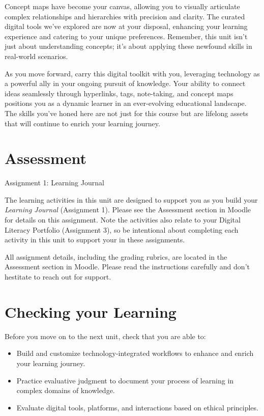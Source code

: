 \documentclass[
]{book}
\providecommand{\tightlist}{%
  \setlength{\itemsep}{0pt}\setlength{\parskip}{0pt}}
\theoremstyle{definition}
\theoremstyle{definition}
\theoremstyle{definition}
\theoremstyle{definition}
\theoremstyle{remark}
\begin{document}
Concept maps have become your canvas, allowing you to visually articulate complex relationships and hierarchies with precision and clarity. The curated digital tools we've explored are now at your disposal, enhancing your learning experience and catering to your unique preferences. Remember, this unit isn't just about understanding concepts; it's about applying these newfound skills in real-world scenarios.

As you move forward, carry this digital toolkit with you, leveraging technology as a powerful ally in your ongoing pursuit of knowledge. Your ability to connect ideas seamlessly through hyperlinks, tags, note-taking, and concept maps positions you as a dynamic learner in an ever-evolving educational landscape. The skills you've honed here are not just for this course but are lifelong assets that will continue to enrich your learning journey.

\hypertarget{assessment-2}{%
\section*{Assessment}\label{assessment-2}}

\begin{assessment}
{Assignment 1: Learning Journal}

The learning activities in this unit are designed to support you as you build your \emph{Learning Journal} (Assignment 1). Please see the Assessment section in Moodle for details on this assignment. Note the activities also relate to your Digital Literacy Portfolio (Assignment 3), so be intentional about completing each activity in this unit to support your in these assignments.

All assignment details, including the grading rubrics, are located in the Assessment section in Moodle. Please read the instructions carefully and don't hestitate to reach out for support.
\end{assessment}

\hypertarget{checking-your-learning-2}{%
\section*{Checking your Learning}\label{checking-your-learning-2}}

\begin{progress}
Before you move on to the next unit, check that you are able to:

\begin{itemize}
\tightlist
\item
  Build and customize technology-integrated workflows to enhance and enrich your learning journey.\\
\item
  Practice evaluative judgment to document your process of learning in complex domains of knowledge.\\
\item
  Evaluate digital tools, platforms, and interactions based on ethical principles.
\end{itemize}
\end{progress}
\end{document}
